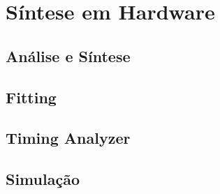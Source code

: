 \chapter{Síntese em Hardware}\label{cap_sintese}

\section{Análise e Síntese}

\section{Fitting}

\section{Timing Analyzer}

\section{Simulação}

